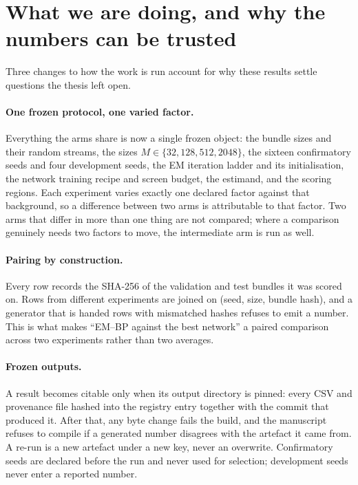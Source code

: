 \documentclass[11pt,a4paper]{article}
\begin{document}
\section{What we are doing, and why the numbers can be trusted}\label{sec:method}

Three changes to how the work is run account for why these results settle questions the thesis
left open.

\paragraph{One frozen protocol, one varied factor.}
Everything the arms share is now a single frozen object: the bundle sizes and their random
streams, the sizes $M\in\{32,128,512,2048\}$, the sixteen confirmatory seeds and four development
seeds, the EM iteration ladder and its initialisation, the network training recipe and screen
budget, the estimand, and the scoring regions. Each experiment varies exactly one declared factor
against that background, so a difference between two arms is attributable to that factor. Two arms
that differ in more than one thing are not compared; where a comparison genuinely needs two
factors to move, the intermediate arm is run as well.

\paragraph{Pairing by construction.}
Every row records the SHA-256 of the validation and test bundles it was scored on. Rows from
different experiments are joined on (seed, size, bundle hash), and a generator that is handed rows
with mismatched hashes refuses to emit a number. This is what makes ``EM--BP against the best
network'' a paired comparison across two experiments rather than two averages.

\paragraph{Frozen outputs.}
A result becomes citable only when its output directory is pinned: every CSV and provenance file
hashed into the registry entry together with the commit that produced it. After that, any byte
change fails the build, and the manuscript refuses to compile if a generated number disagrees with
the artefact it came from. A re-run is a new artefact under a new key, never an overwrite.
Confirmatory seeds are declared before the run and never used for selection; development seeds
never enter a reported number.
\end{document}
